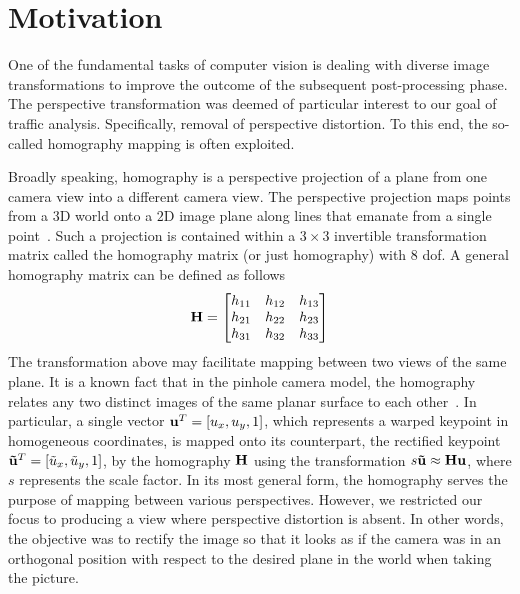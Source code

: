 \section{Motivation}
\label{sec:HomographyMotivation}

One of the fundamental tasks of computer vision is dealing with diverse image transformations to improve the outcome of the subsequent post-processing phase. The perspective transformation was deemed of particular interest to our goal of traffic analysis. Specifically, removal of perspective distortion. To this end, the so-called homography mapping is often exploited.

Broadly speaking, homography is a perspective projection of a plane from one camera view into a different camera view. The perspective projection maps points from a $3$D world onto a $2$D image plane along lines that emanate from a single point~\cite{geetha2013automatic, bousaid2020perspective}. Such a projection is contained within a $3 \times 3$ invertible transformation matrix called the homography matrix (or just homography) with $8$ \gls{dof}. A general homography matrix can be defined as follows
\begin{equation}
    \label{eq:HomographyMatrix}
    \mathbf{H} =
    \begin{bmatrix}
        h_{11} & h_{12} & h_{13} \\
        h_{21} & h_{22} & h_{23} \\
        h_{31} & h_{32} & h_{33}
    \end{bmatrix}
\end{equation}
The transformation above may facilitate mapping between two views of the same plane. It is a known fact that in the pinhole camera model, the homography relates any two distinct images of the same planar surface to each other~\cite{hartley2003multiple, hartley1997defense}. In particular, a single vector ${\mathbf{u}}^T = \left[ {u_x, u_y, 1} \right]$, which represents a warped keypoint in homogeneous coordinates, is mapped onto its counterpart, the rectified keypoint ${\mathbf{\tilde{u}}}^T = \left[ {\tilde{u}_x, \tilde{u}_y, 1} \right]$, by the homography $\mathbf{H}$ using the transformation $s \mathbf{\tilde{u}} \approx \mathbf{H} \mathbf{u}$, where $s$ represents the scale factor. In its most general form, the homography serves the purpose of mapping between various perspectives. However, we restricted our focus to producing a view where perspective distortion is absent. In other words, the objective was to rectify the image so that it looks as if the camera was in an orthogonal position with respect to the desired plane in the world when taking the picture.

